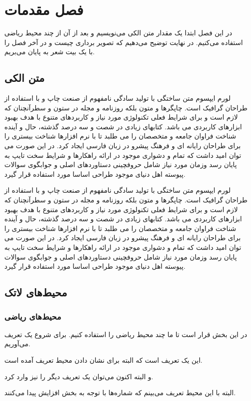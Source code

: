 \chapter{فصل مقدمات}
\begin{summary}
در این فصل ابتدا یک مقدار متن الکی می‌نویسیم و بعد از آن از چند محیط ریاضی استفاده می‌کنیم. در نهایت توضیح می‌دهیم که تصویر برداری چیست و در آخر فصل را با یک بیت شعر به پایان می‌بریم.
\end{summary}

\section{متن الکی}
لورم ایپسوم متن ساختگی با تولید سادگی نامفهوم از صنعت چاپ و با استفاده از طراحان گرافیک است. چاپگرها و متون بلکه روزنامه و مجله در ستون و سطرآنچنان که لازم است و برای شرایط فعلی تکنولوژی مورد نیاز و کاربردهای متنوع با هدف بهبود ابزارهای کاربردی می باشد. کتابهای زیادی در شصت و سه درصد گذشته، حال و آینده شناخت فراوان جامعه و متخصصان را می طلبد تا با نرم افزارها شناخت بیستری را برای طراحان رایانه ای و فرهنگ پیشرو در زبان فارسی ایجاد کرد. در این صورت می توان امید داشت که تمام و دشواری موجود در ارائه راهکارها و شرایط سخت تایپ به پایان رسد وزمان مورد نیاز شامل حروفچینی دستاوردهای اصلی و جوابگوی سوالات پیوسته اهل دنیای موجود طراحی اساسا مورد استفاده قرار گیرد.

لورم ایپسوم متن ساختگی با تولید سادگی نامفهوم از صنعت چاپ و با استفاده از طراحان گرافیک است. چاپگرها و متون بلکه روزنامه و مجله در ستون و سطرآنچنان که لازم است و برای شرایط فعلی تکنولوژی مورد نیاز و کاربردهای متنوع با هدف بهبود ابزارهای کاربردی می باشد. کتابهای زیادی در شصت و سه درصد گذشته، حال و آینده شناخت فراوان جامعه و متخصصان را می طلبد تا با نرم افزارها شناخت بیستری را برای طراحان رایانه ای و فرهنگ پیشرو در زبان فارسی ایجاد کرد. در این صورت می توان امید داشت که تمام و دشواری موجود در ارائه راهکارها و شرایط سخت تایپ به پایان رسد وزمان مورد نیاز شامل حروفچینی دستاوردهای اصلی و جوابگوی سوالات پیوسته اهل دنیای موجود طراحی اساسا مورد استفاده قرار گیرد.

\section{محیط‌های لاتک}
\subsection{محیط‌های ریاضی}
در این بخش قرار است تا ما چند محیط ریاضی را استفاده کنیم. برای شروع یک تعریف می‌آوریم.
\begin{definition}
این یک تعریف است که البته برای نشان دادن محیط تعریف آمده است.
\end{definition}
و البته اکنون می‌توان یک تعریف دیگر را نیز وارد کرد.
\begin{definition}
البته با این محیط تعریف می‌بینم که شماره‌ها با توجه به بخش افزایش پیدا می‌کنند.
\end{definition}

